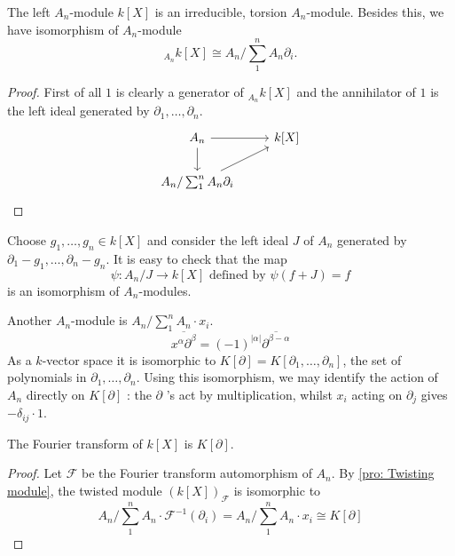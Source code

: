 \documentclass[12pt, oneside]{book}
\begin{document}
\begin{proposition}
    The left $A_n$-module $k[X]$ is an irreducible, torsion $A_n$-module. Besides this, we have isomorphism of $A_n$-module
    \begin{equation*}
        {}_{A_n}k[X] \cong A_n / \sum_1^n A_n \partial_i .
    \end{equation*}
    \begin{proof}
        First of all $1$ is clearly a generator of ${}_{A_n}k[X]$ and the annihilator of $1$ is the left ideal generated by $\partial_1,\ldots,\partial_n$.
        \begin{equation*}
            \begin{tikzcd}
                A_n\arrow[r,""]\arrow[d,""]&k[X] \\
                A_n / \sum_1^n A_n \partial_i \arrow[ru,""]&
            \end{tikzcd}
        \end{equation*}
    \end{proof}
    \begin{remark}
        Choose $g_1, \ldots, g_n \in k[X]$ and consider the left ideal $J$ of $A_n$ generated by $\partial_1-g_1, \ldots, \partial_n-g_n$.
        It is easy to check that
        the map \begin{equation*}
            \psi: A_n / J \longrightarrow k[X] \text{ defined by } \psi(f+J)=f
        \end{equation*}
        is an isomorphism of $A_n$-modules.
    \end{remark}
\end{proposition}

\begin{proposition}
    Another $A_n$-module is $A_n / \sum_1^n A_n \cdot x_i$.
    \begin{equation*}
        \overline{x^\alpha \partial^\beta}
        =
        \left(-1\right)^{\left|\alpha\right|}\overline{\partial^{\beta-\alpha}}
    \end{equation*}
    As a $k$-vector space it is isomorphic to $K[\partial]=K\left[\partial_1, \ldots, \partial_n\right]$, the set of polynomials in $\partial_1, \ldots, \partial_n$. Using this isomorphism, we may identify the action of $A_n$
    directly on $K[\partial]$ : the $\partial$ 's act by multiplication, whilst $x_i$ acting on $\partial_j$ gives $-\delta_{i j} \cdot 1$.

\end{proposition}
\begin{proposition}
    The Fourier transform of $k[X]$ is $K[\partial]$.
    \begin{proof}
        Let $\mathcal{F}$ be the Fourier transform automorphism of $A_n$. By \cref{pro: Twisting module}, the twisted module $\left(k[X]\right)_{\mathcal{F}}$ is isomorphic to
        \begin{equation*}
            A_n / \sum_1^n A_n \cdot \mathcal{F}^{-1}\left(\partial_i\right)
            =
            A_n / \sum_1^n A_n \cdot x_i\cong K[\partial]
        \end{equation*}
    \end{proof}
\end{proposition}
\end{document}
